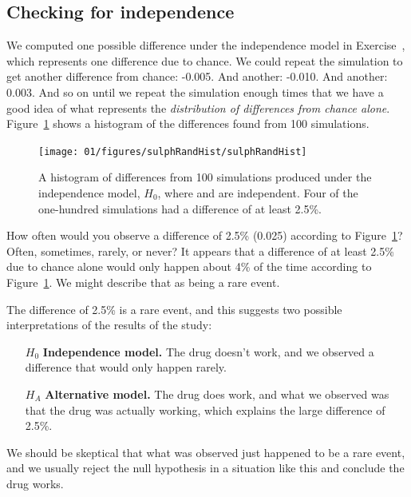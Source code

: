 \subsection{Checking for independence}

We computed one possible difference under the independence model in Exercise~, which represents one difference due to chance. We could repeat the simulation to get another difference from chance: -0.005. And another: -0.010. And another: 0.003. And so on until we repeat the simulation enough times that we have a good idea of what represents the \emph{distribution of differences from chance alone}. Figure~\ref{sulphRandHist} shows a histogram of the differences found from 100 simulations.
\setlength{\captionwidth}{\mycaptionwidth+3mm}
 \begin{figure}[ht]
    \centering
    \texttt{[image: 01/figures/sulphRandHist/sulphRandHist]}
    \caption{A histogram of differences from 100 simulations produced under the independence model, $H_0$, where  and  are independent. Four of the one-hundred simulations had a difference of at least 2.5\%.}
    \label{sulphRandHist}
 \end{figure}
\setlength{\captionwidth}{\mycaptionwidth}
 
\begin{example}{How often would you observe a difference of 2.5\% (0.025) according to Figure~\ref{sulphRandHist}? Often, sometimes, rarely, or never?}
It appears that a difference of at least 2.5\% due to chance alone would only happen about 4\% of the time according to Figure~\ref{sulphRandHist}. We might describe that as being a rare event.
\end{example}

The difference of 2.5\% is a rare event, and this suggests two possible interpretations of the results of the study:
\begin{itemize}
\setlength{\itemsep}{0mm}
\item[$H_0$] \textbf{Independence model.} The drug doesn't work, and we observed a difference that would only happen rarely.
\item[$H_A$] \textbf{Alternative model.} The drug does work, and what we observed was that the drug was actually working, which explains the large difference of 2.5\%.
\end{itemize}
We should be skeptical that what was observed just happened to be a rare event, and we usually reject the null hypothesis in a situation like this and conclude the drug works.

